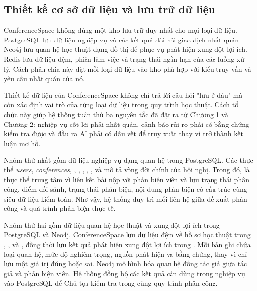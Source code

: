 \subsection{Thiết kế cơ sở dữ liệu và lưu trữ dữ liệu}

ConferenceSpace không dùng một kho lưu trữ duy nhất cho mọi loại dữ liệu. PostgreSQL lưu dữ liệu nghiệp vụ và các kết quả đòi hỏi giao dịch nhất quán. Neo4j lưu quan hệ học thuật dạng đồ thị để phục vụ phát hiện xung đột lợi ích. Redis lưu dữ liệu đệm, phiên làm việc và trạng thái ngắn hạn của các luồng xử lý. Cách phân chia này đặt mỗi loại dữ liệu vào kho phù hợp với kiểu truy vấn và yêu cầu nhất quán của nó.

Thiết kế dữ liệu của ConferenceSpace không chỉ trả lời câu hỏi "lưu ở đâu" mà còn xác định vai trò của từng loại dữ liệu trong quy trình học thuật. Cách tổ chức này giúp hệ thống tuân thủ ba nguyên tắc đã đặt ra từ Chương 1 và Chương 2: nghiệp vụ cốt lõi phải nhất quán, cảnh báo rủi ro phải có bằng chứng kiểm tra được và đầu ra AI phải có dấu vết để truy xuất thay vì trở thành kết luận mơ hồ.

Nhóm thứ nhất gồm dữ liệu nghiệp vụ dạng quan hệ trong PostgreSQL. Các thực thể \textit{users}, \textit{conferences}, , , , , ,  và  mô tả vòng đời chính của hội nghị. Trong đó,  là thực thể trung tâm vì liên kết bài nộp với phản biện viên và lưu trạng thái phân công, điểm đối sánh, trạng thái phản biện, nội dung phản biện có cấu trúc cùng siêu dữ liệu kiểm toán. Nhờ vậy, hệ thống duy trì mối liên hệ giữa đề xuất phân công và quá trình phản biện thực tế.

Nhóm thứ hai gồm dữ liệu quan hệ học thuật và xung đột lợi ích trong PostgreSQL và Neo4j. ConferenceSpace lưu dữ liệu đệm về hồ sơ học thuật trong , ,  và , đồng thời lưu kết quả phát hiện xung đột lợi ích trong . Mỗi bản ghi  chứa loại quan hệ, mức độ nghiêm trọng, nguồn phát hiện và bằng chứng, thay vì chỉ lưu một giá trị đúng hoặc sai. Neo4j mô hình hóa quan hệ đồng tác giả giữa tác giả và phản biện viên. Hệ thống đồng bộ các kết quả cần dùng trong nghiệp vụ vào PostgreSQL để Chủ tọa kiểm tra trong cùng quy trình phân công.

